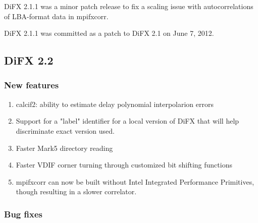DiFX 2.1.1 was a minor patch release to fix a scaling issue with autocorrelations of LBA-format data in mpifxcorr.

DiFX 2.1.1 was committed as a patch to DiFX 2.1 on June 7, 2012.


\subsection{DiFX 2.2}

\subsubsection{New features}

\begin{enumerate}
\item calcif2: ability to estimate delay polynomial interpolarion errors
\item Support for a "label" identifier for a local version of DiFX that will help discriminate exact version used.
\item Faster Mark5 directory reading
\item Faster VDIF corner turning through customized bit shifting functions
\item mpifxcorr can now be built without Intel Integrated Performance Primitives, though resulting in a slower correlator.
\end{enumerate}

\subsubsection{Bug fixes}

